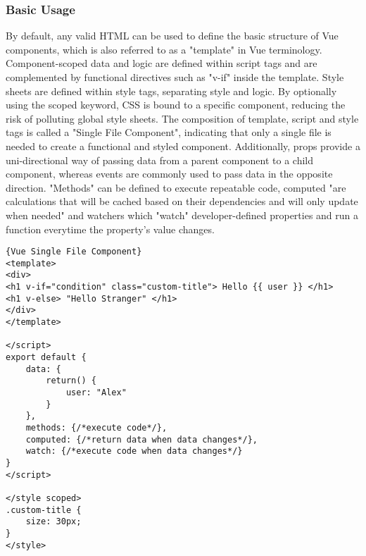 \subsubsection{Basic Usage} \label{subsub:vueusage}
 By default, any valid HTML can be used to define the basic structure of Vue components, which is also referred to as a "template" in Vue terminology. Component-scoped data and logic are defined within script tags and are complemented by functional directives such as "v-if" inside the template. Style sheets are defined within style tags, separating style and logic. By optionally using the scoped keyword, CSS is bound to a specific component, reducing the risk of polluting global style sheets. The composition of template, script and style tags is called a "Single File Component", indicating that only a single file is needed to create a functional and styled component. Additionally, props provide a uni-directional way of passing data from a parent component to a child component, whereas events are commonly used to pass data in the opposite direction. "Methods" can be defined to execute repeatable code, \gls{computed} "are calculations that will be cached based on their dependencies and will only update when needed" \cite{filipova2016learning} and \gls{watchers} which "watch" developer-defined properties and run a function everytime the property's value changes. \newline

\begin{lstlisting}[caption=Vue Single File Component, captionpos=b, style=htmlcssjs]{Vue Single File Component}
<template>
<div>
<h1 v-if="condition" class="custom-title"> Hello {{ user }} </h1>
<h1 v-else> "Hello Stranger" </h1>
</div>
</template>

</script>
export default {
    data: {
        return() {
            user: "Alex"
        }
    },
    methods: {/*execute code*/},
    computed: {/*return data when data changes*/},
    watch: {/*execute code when data changes*/}
}
</script>

</style scoped>
.custom-title {
    size: 30px;
}
</style>
\end{lstlisting}

